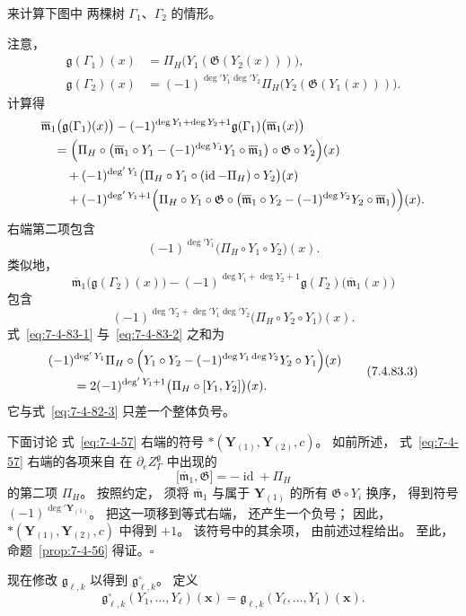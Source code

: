 
来计算下图中
两棵树 $\Gamma_1$、$\Gamma_2$
的情形。

注意，
\[
\begin{aligned}
\mathfrak g(\Gamma_1)(x)
&=\Pi_H\bigl(
Y_1(\mathfrak G(Y_2(x)))
\bigr),\\
\mathfrak g(\Gamma_2)(x)
&=(-1)^{\deg'Y_1\deg'Y_2}
\Pi_H\bigl(
Y_2(\mathfrak G(Y_1(x)))
\bigr).
\end{aligned}
\]
计算得
\[
\begin{aligned}
&\overline{\mathfrak m}_1
\bigl(\mathfrak g(\Gamma_1)(x)\bigr)
-(-1)^{\deg Y_1+\deg Y_2+1}
\mathfrak g(\Gamma_1)
\bigl(\overline{\mathfrak m}_1(x)\bigr)\\
&\quad=
\Bigl(
\Pi_H\circ
\bigl(
\overline{\mathfrak m}_1\circ Y_1
-(-1)^{\deg Y_1}
Y_1\circ\overline{\mathfrak m}_1
\bigr)
\circ\mathfrak G\circ Y_2
\Bigr)(x)\\
&\qquad+
(-1)^{\deg'Y_1}
\bigl(
\Pi_H\circ Y_1\circ
(\operatorname{id}-\Pi_H)
\circ Y_2
\bigr)(x)\\
&\qquad+
(-1)^{\deg'Y_1+1}
\Bigl(
\Pi_H\circ Y_1\circ\mathfrak G
\circ
\bigl(
\overline{\mathfrak m}_1\circ Y_2
-(-1)^{\deg Y_2}
Y_2\circ\overline{\mathfrak m}_1
\bigr)
\Bigr)(x).
\end{aligned}
\]
右端第二项包含
\begin{equation}
(-1)^{\deg'Y_1}
\bigl(
\Pi_H\circ Y_1\circ Y_2
\bigr)(x).
\tag{7.4.83.1}\label{eq:7-4-83-1}
\end{equation}
类似地，
\[
\overline{\mathfrak m}_1
\bigl(\mathfrak g(\Gamma_2)(x)\bigr)
-(-1)^{\deg Y_1+\deg Y_2+1}
\mathfrak g(\Gamma_2)
\bigl(\overline{\mathfrak m}_1(x)\bigr)
\]
包含
\begin{equation}
(-1)^{
\deg'Y_2+\deg'Y_1\deg'Y_2
}
\bigl(
\Pi_H\circ Y_2\circ Y_1
\bigr)(x).
\tag{7.4.83.2}\label{eq:7-4-83-2}
\end{equation}
式~\eqref{eq:7-4-83-1}
与~\eqref{eq:7-4-83-2}
之和为
\begin{equation}
\begin{aligned}
&(-1)^{\deg'Y_1}
\Pi_H\circ
\Bigl(
Y_1\circ Y_2
-(-1)^{\deg Y_1\deg Y_2}
Y_2\circ Y_1
\Bigr)(x)\\
&\qquad=
2(-1)^{\deg'Y_1+1}
\bigl(
\Pi_H\circ[Y_1,Y_2]
\bigr)(x).
\end{aligned}
\tag{7.4.83.3}\label{eq:7-4-83-3}
\end{equation}
它与式~\eqref{eq:7-4-82-3}
只差一个整体负号。

下面讨论
式~\eqref{eq:7-4-57}
右端的符号
$*(\mathbf Y_{(1)},\mathbf Y_{(2)},c)$。
如前所述，
式~\eqref{eq:7-4-57}
右端的各项来自
在 $\partial_e Z_\Gamma^{\mathfrak g}$
中出现的
\[
\bigl[
\overline{\mathfrak m}_1,\mathfrak G
\bigr]
=-\operatorname{id}+\Pi_H
\]
的第二项 $\Pi_H$。
按照约定，
须将
$\overline{\mathfrak m}_1$
与属于
$\mathbf Y_{(1)}$
的所有
$\mathfrak G\circ Y_i$
换序，
得到符号
$(-1)^{\deg'\mathbf Y_{(1)}}$。
把这一项移到等式右端，
还产生一个负号；
因此，
$*(\mathbf Y_{(1)},\mathbf Y_{(2)},c)$
中得到 $+1$。
该符号中的其余项，
由前述过程给出。
至此，
命题~\ref{prop:7-4-56}
得证。\hfill$\square$

现在修改
$\mathfrak g_{\ell,k}$
以得到
$\mathfrak g_{\ell,k}^{\circ}$。
定义
\begin{equation}
\mathfrak g_{\ell,k}^{\circ}
(Y_1,\ldots,Y_\ell)(\mathbf x)
=
\mathfrak g_{\ell,k}
(Y_\ell,\ldots,Y_1)(\mathbf x).
\tag{7.4.84}\label{eq:7-4-84}
\end{equation}
